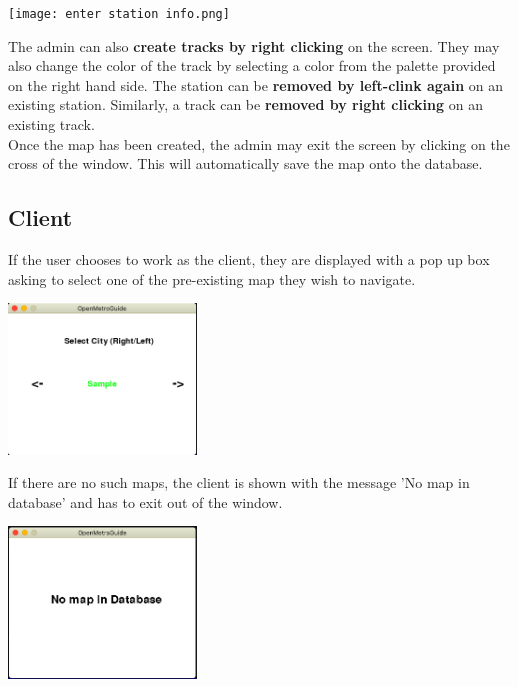 \documentclass[fontsize=11pt]{article}
\begin{document}
    \begin{center}
        \texttt{[image: enter station info.png]}\\
    \end{center}
    The admin can also \textbf{create tracks by right clicking} on the screen. They may also change the color of the track by selecting a color from the palette provided on the right hand side. The station can be \textbf{removed by left-clink again} on an existing station. Similarly, a track can be \textbf{removed by right clicking} on an existing track.\\
    Once the map has been created, the admin may exit the screen by clicking on the cross of the window. This will automatically save the map onto the database.

    \subsection*{Client}
    If the user chooses to work as the client, they are displayed with a pop up box asking to select one of the pre-existing map they wish to navigate.\\
    \begin{center}
        \includegraphics[width = 5cm]{client select city.png}\\
    \end{center}
    If there are no such maps, the client is shown with the message 'No map in database' and has to exit out of the window.\\
    \begin{center}
        \includegraphics[width = 5cm]{no maps in database.png}\\
    \end{center}
\end{document}
